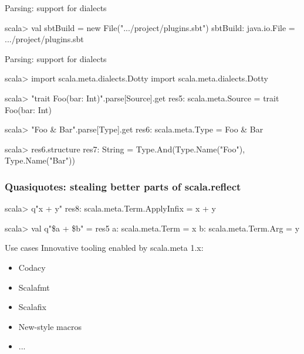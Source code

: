 \documentclass[svgnames,dvipsnames,hyperref={bookmarks=false},usepdftitle=false]{beamer}
\begin{document}
\begin{frame}[fragile]{Parsing: support for dialects}
\begin{semiverbatim}
scala> val sbtBuild = new File(".../project/plugins.sbt")
sbtBuild: java.io.File = .../project/plugins.sbt

\end{semiverbatim}
\end{frame}

\begin{frame}[fragile]{Parsing: support for dialects}
\begin{semiverbatim}
scala> \alert{import scala.meta.dialects.Dotty}
\alert{import scala.meta.dialects.Dotty}

scala> "trait Foo(bar: Int)".parse[Source].get
res5: scala.meta.Source = trait Foo(bar: Int)

scala> "Foo \& Bar".parse[Type].get
res6: scala.meta.Type = Foo \& Bar

scala> res6.structure
res7: String = Type.And(Type.Name("Foo"), Type.Name("Bar"))
\end{semiverbatim}
\end{frame}

\begin{frame}[fragile]
\frametitle<1>{Quasiquotes: stealing better parts of scala.reflect}
\begin{semiverbatim}
scala> q"x + y"
res8: scala.meta.Term.ApplyInfix = x + y

scala> val q"\$a + \$b" = res5
a: scala.meta.Term = x
b: scala.meta.Term.Arg = y
\end{semiverbatim}
\end{frame}


\begin{frame}{Use cases}
Innovative tooling enabled by scala.meta 1.x:
\begin{itemize}
\item Codacy
\item Scalafmt
\item Scalafix
\item New-style macros
\item ...
\end{itemize}
\end{frame}
\end{document}

